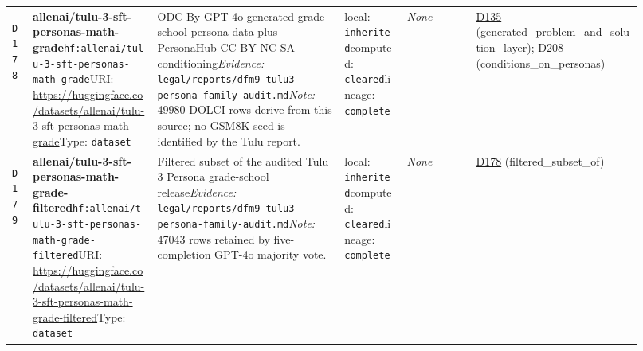 \documentclass[9pt,a4paper]{article}
\newcommand{\depid}[1]{\hypertarget{dep:#1}{\texttt{#1}}}
\begin{document}
\begin{landscape}
\begin{longtable}{@{}L{0.035\linewidth}L{0.185\linewidth}L{0.27\linewidth}L{0.09\linewidth}L{0.10\linewidth}L{0.24\linewidth}@{}}
\depid{D178} & \textbf{allenai/tulu-3-sft-personas-math-grade}\newline \nolinkurl{hf:allenai/tulu-3-sft-personas-math-grade}\newline URI: \url{https://huggingface.co/datasets/allenai/tulu-3-sft-personas-math-grade}\newline Type: \texttt{dataset} & ODC-By GPT-4o-generated grade-school persona data plus PersonaHub CC-BY-NC-SA conditioning\newline \textit{Evidence:} \nolinkurl{legal/reports/dfm9-tulu3-persona-family-audit.md}\newline \textit{Note:} 49980 DOLCI rows derive from this source; no GSM8K seed is identified by the Tulu report. & local: \texttt{inherited}\newline computed: \texttt{cleared}\newline lineage: \texttt{complete} & \textit{None} & \hyperlink{dep:D135}{D135} (generated\_problem\_and\_solution\_layer); \hyperlink{dep:D208}{D208} (conditions\_on\_personas) \\
\depid{D179} & \textbf{allenai/tulu-3-sft-personas-math-grade-filtered}\newline \nolinkurl{hf:allenai/tulu-3-sft-personas-math-grade-filtered}\newline URI: \url{https://huggingface.co/datasets/allenai/tulu-3-sft-personas-math-grade-filtered}\newline Type: \texttt{dataset} & Filtered subset of the audited Tulu 3 Persona grade-school release\newline \textit{Evidence:} \nolinkurl{legal/reports/dfm9-tulu3-persona-family-audit.md}\newline \textit{Note:} 47043 rows retained by five-completion GPT-4o majority vote. & local: \texttt{inherited}\newline computed: \texttt{cleared}\newline lineage: \texttt{complete} & \textit{None} & \hyperlink{dep:D178}{D178} (filtered\_subset\_of) \\

\end{longtable}
\end{landscape}
\end{document}

